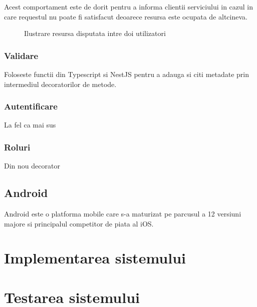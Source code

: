 Acest comportament este de dorit pentru a informa clientii serviciului in cazul in care requestul nu poate fi satisfacut deoarece resursa este ocupata de altcineva.

\begin{figure}[h!]
  \centering
  \caption{Ilustrare resursa disputata intre doi utilizatori}
\end{figure}


\subsubsection {Validare}

Foloseste functii din Typescript si NestJS pentru a adauga si citi metadate prin intermediul decoratorilor de metode.

\subsubsection {Autentificare}

La fel ca mai sus

\subsubsection {Roluri}

Din nou decorator


\subsection {Android}

Android este o platforma mobile care s-a maturizat pe parcusul a 12 versiuni majore si principalul competitor de piata al iOS.


\section {Implementarea sistemului}


\section {Testarea sistemului}